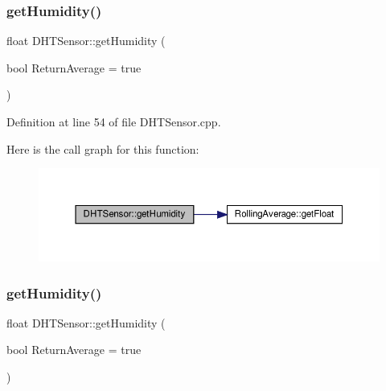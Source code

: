 \subsubsection{\texorpdfstring{get\+Humidity()}{getHumidity()}\hspace{0.1cm}{\footnotesize\ttfamily [1/2]}}
{\footnotesize\ttfamily float D\+H\+T\+Sensor\+::get\+Humidity (\begin{DoxyParamCaption}\item[{bool}]{Return\+Average = {\ttfamily true} }\end{DoxyParamCaption})}



Definition at line 54 of file D\+H\+T\+Sensor.\+cpp.

Here is the call graph for this function\+:
\nopagebreak
\begin{figure}[H]
\begin{center}
\leavevmode
\includegraphics[width=350pt]{class_d_h_t_sensor_a522c1a47a86f3908581ff283ca3c61ec_cgraph}
\end{center}
\end{figure}
\mbox{\label{class_d_h_t_sensor_a522c1a47a86f3908581ff283ca3c61ec}} 
\subsubsection{\texorpdfstring{get\+Humidity()}{getHumidity()}\hspace{0.1cm}{\footnotesize\ttfamily [2/2]}}
{\footnotesize\ttfamily float D\+H\+T\+Sensor\+::get\+Humidity (\begin{DoxyParamCaption}\item[{bool}]{Return\+Average = {\ttfamily true} }\end{DoxyParamCaption})}

\mbox{\label{class_d_h_t_sensor_a795e7b88ea1b141213f7781d40cca458}} 
